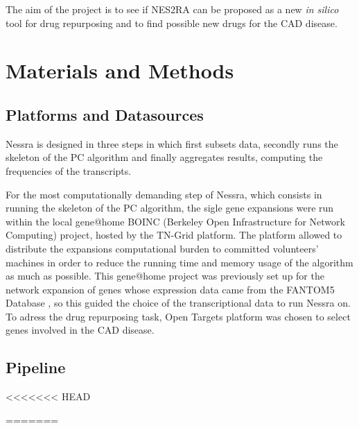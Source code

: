 \documentclass[fleqn,10pt]{SelfArx} %
\begin{document}
The aim of the project is to see if NES2RA can be proposed as a new \textit{in silico} tool for drug repurposing and to find possible new drugs for the CAD disease.  


\section*{Materials and Methods}



\subsection*{Platforms and Datasources}

Nessra is designed in three steps in which first subsets data,
secondly runs the skeleton of the PC algorithm and finally aggregates results, computing the frequencies of the transcripts.

For the most computationally demanding step of Nessra, which consists in running the skeleton of the PC algorithm, the sigle gene expansions were run within the local gene@home \cite{boinc} BOINC (Berkeley Open Infrastructure for Network Computing) project, hosted by the TN-Grid platform. 
The platform allowed to distribute the expansions computational burden to committed volunteers' machines in order to reduce the running time and memory usage of the algorithm as much as possible.
This gene@home project was previously set up for the network expansion of genes whose expression data came from the FANTOM5 Database \cite{fantom}, so this guided the choice of the transcriptional data to run Nessra on.
To adress the drug repurposing task, Open Targets\cite{open} platform was chosen to select genes involved in the CAD disease.  


\subsection*{Pipeline}
<<<<<<< HEAD
=======

\end{document}
